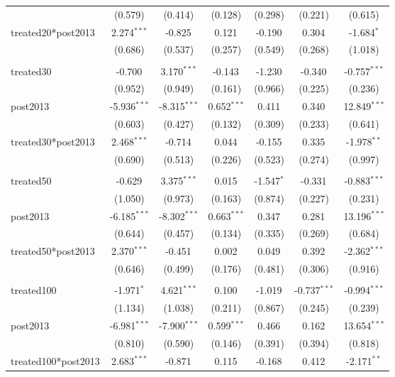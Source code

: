 \documentclass[12pt]{article}
\begin{document}
\begin{table}[!htbp]
\begin{tabular}{@{\extracolsep{5pt}}lcccccc}
  & (0.579) & (0.414) & (0.128) & (0.298) & (0.221) & (0.615) \\
 treated20*post2013 & 2.274$^{***}$ & -0.825$^{}$ & 0.121$^{}$ & -0.190$^{}$ & 0.304$^{}$ & -1.684$^{*}$ \\
  & (0.686) & (0.537) & (0.257) & (0.549) & (0.268) & (1.018) \\
\hline \\[-1.8ex]
 treated30 & -0.700$^{}$ & 3.170$^{***}$ & -0.143$^{}$ & -1.230$^{}$ & -0.340$^{}$ & -0.757$^{***}$ \\
  & (0.952) & (0.949) & (0.161) & (0.966) & (0.225) & (0.236) \\
 post2013 & -5.936$^{***}$ & -8.315$^{***}$ & 0.652$^{***}$ & 0.411$^{}$ & 0.340$^{}$ & 12.849$^{***}$ \\
  & (0.603) & (0.427) & (0.132) & (0.309) & (0.233) & (0.641) \\
 treated30*post2013 & 2.468$^{***}$ & -0.714$^{}$ & 0.044$^{}$ & -0.155$^{}$ & 0.335$^{}$ & -1.978$^{**}$ \\
  & (0.690) & (0.513) & (0.226) & (0.523) & (0.274) & (0.997) \\
\hline \\[-1.8ex]
 treated50 & -0.629$^{}$ & 3.375$^{***}$ & 0.015$^{}$ & -1.547$^{*}$ & -0.331$^{}$ & -0.883$^{***}$ \\
  & (1.050) & (0.973) & (0.163) & (0.874) & (0.227) & (0.231) \\
 post2013 & -6.185$^{***}$ & -8.302$^{***}$ & 0.663$^{***}$ & 0.347$^{}$ & 0.281$^{}$ & 13.196$^{***}$ \\
  & (0.644) & (0.457) & (0.134) & (0.335) & (0.269) & (0.684) \\
 treated50*post2013 & 2.370$^{***}$ & -0.451$^{}$ & 0.002$^{}$ & 0.049$^{}$ & 0.392$^{}$ & -2.362$^{***}$ \\
  & (0.646) & (0.499) & (0.176) & (0.481) & (0.306) & (0.916) \\
\hline \\[-1.8ex]
 treated100 & -1.971$^{*}$ & 4.621$^{***}$ & 0.100$^{}$ & -1.019$^{}$ & -0.737$^{***}$ & -0.994$^{***}$ \\
  & (1.134) & (1.038) & (0.211) & (0.867) & (0.245) & (0.239) \\
 post2013 & -6.981$^{***}$ & -7.900$^{***}$ & 0.599$^{***}$ & 0.466$^{}$ & 0.162$^{}$ & 13.654$^{***}$ \\
  & (0.810) & (0.590) & (0.146) & (0.391) & (0.394) & (0.818) \\
 treated100*post2013 & 2.683$^{***}$ & -0.871$^{}$ & 0.115$^{}$ & -0.168$^{}$ & 0.412$^{}$ & -2.171$^{**}$ \\

\end{tabular}
\end{table}
\end{document}
